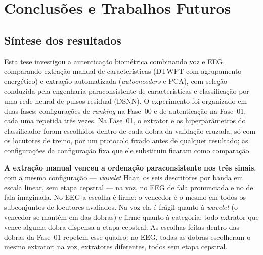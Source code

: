\chapter{Conclusões e Trabalhos Futuros} \label{chap:conclusions}

	\section{Síntese dos resultados}

		\par Esta tese investigou a autenticação biométrica combinando voz e
		\ac{EEG}, comparando extração manual de características (\ac{DTWPT} com
		agrupamento energético) e extração automatizada (\textit{autoencoders}
		e \ac{PCA}), com seleção conduzida pela engenharia paraconsistente de
		características e classificação por uma rede neural de pulsos residual
		(\ac{DSNN}). O experimento foi organizado em duas fases:
		 configurações de \textit{ranking} na Fase~00 e
		 de autenticação na Fase~01, cada uma repetida três
		vezes. Na Fase~01, o extrator e os hiperparâmetros do classificador
		foram escolhidos dentro de cada dobra da validação cruzada, só com os
		locutores de treino, por um protocolo fixado antes de qualquer resultado;
		as  configurações da configuração fixa que ele substituiu
		ficaram como comparação.

		\par \textbf{A extração manual venceu a ordenação paraconsistente nos três
		sinais}, com a mesma configuração --- \textit{wavelet} Haar, os seis
		descritores por banda em escala linear, sem etapa cepstral --- na voz, no \ac{EEG} de
		fala pronunciada e no de fala imaginada. No \ac{EEG} a escolha é firme:
		o vencedor é o mesmo em todos os subconjuntos de locutores avaliados. Na
		voz ela é frágil quanto à \textit{wavelet} (o vencedor se mantém em
		 das  dobras) e
		firme quanto à categoria: todo extrator que vence alguma dobra dispensa a
		etapa cepstral. As escolhas feitas dentro das dobras da Fase~01 repetem
		esse quadro: no \ac{EEG}, todas as dobras escolheram o mesmo extrator; na
		voz,  extratores diferentes, todos sem etapa
		cepstral.

